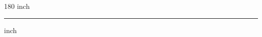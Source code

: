 
\begin{frame}
\begin{center}
\begin{turn}{180}
{\fontsize{2.5cm}{1em}\selectfont inch}
\end{turn}
\vspace{1em}\par  
\hrule
\vspace{1em}\par  
{\fontsize{2.5cm}{1em}\selectfont inch}
\end{center}
\end{frame}
